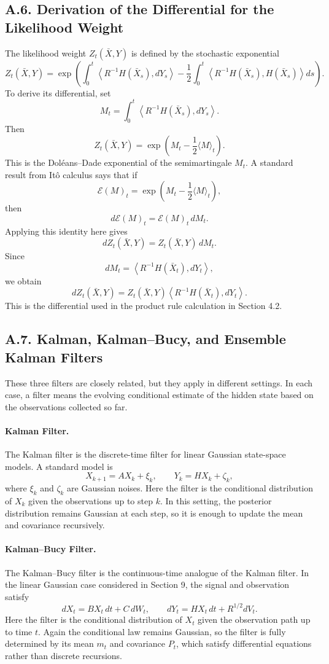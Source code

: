 \documentclass[11pt]{article}
\theoremstyle{definition}
\theoremstyle{remark}
\begin{document}
\subsection*{A.6. Derivation of the Differential for the Likelihood Weight}
The likelihood weight $Z_t(\bar X,Y)$ is defined by the stochastic exponential
\[
Z_t(\bar X,Y)
=
\exp\left(
\int_0^t \left\langle R^{-1}H(\bar X_s),dY_s\right\rangle
-\frac12\int_0^t \left\langle R^{-1}H(\bar X_s),H(\bar X_s)\right\rangle ds
\right).
\]
To derive its differential, set
\[
M_t=\int_0^t \left\langle R^{-1}H(\bar X_s),dY_s\right\rangle.
\]
Then
\[
Z_t(\bar X,Y)=\exp\left(M_t-\frac12\langle M\rangle_t\right).
\]
This is the Dol\'eans--Dade exponential of the semimartingale $M_t$. A standard result from It\^o calculus says that if
\[
\mathcal E(M)_t=\exp\left(M_t-\frac12\langle M\rangle_t\right),
\]
then
\[
d\mathcal E(M)_t=\mathcal E(M)_t\,dM_t.
\]
Applying this identity here gives
\[
dZ_t(\bar X,Y)=Z_t(\bar X,Y)\,dM_t.
\]
Since
\[
dM_t=\left\langle R^{-1}H(\bar X_t),dY_t\right\rangle,
\]
we obtain
\[
dZ_t(\bar X,Y)=Z_t(\bar X,Y)\left\langle R^{-1}H(\bar X_t),dY_t\right\rangle.
\]
This is the differential used in the product rule calculation in Section 4.2.

\subsection*{A.7. Kalman, Kalman--Bucy, and Ensemble Kalman Filters}
These three filters are closely related, but they apply in different settings. In each case, a filter means the evolving conditional estimate of the hidden state based on the observations collected so far.

\paragraph{Kalman Filter.}
The Kalman filter is the discrete-time filter for linear Gaussian state-space models. A standard model is
\[
X_{k+1}=AX_k+\xi_k,
\qquad
Y_k=HX_k+\zeta_k,
\]
where $\xi_k$ and $\zeta_k$ are Gaussian noises. Here the filter is the conditional distribution of $X_k$ given the observations up to step $k$. In this setting, the posterior distribution remains Gaussian at each step, so it is enough to update the mean and covariance recursively.

\paragraph{Kalman--Bucy Filter.}
The Kalman--Bucy filter is the continuous-time analogue of the Kalman filter. In the linear Gaussian case considered in Section 9, the signal and observation satisfy
\[
dX_t=BX_t\,dt+C\,dW_t,
\qquad
dY_t=HX_t\,dt+R^{1/2}dV_t.
\]
Here the filter is the conditional distribution of $X_t$ given the observation path up to time $t$. Again the conditional law remains Gaussian, so the filter is fully determined by its mean $m_t$ and covariance $P_t$, which satisfy differential equations rather than discrete recursions.
\end{document}
